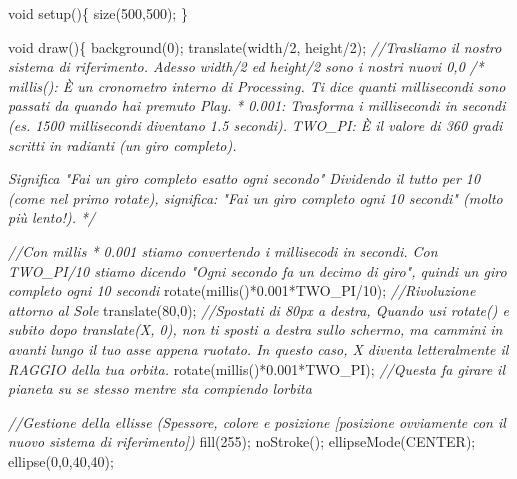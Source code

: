 \documentclass[
]{article}
\newenvironment{Shaded}{}{}
\newcommand{\CommentTok}[1]{\textcolor[rgb]{0.38,0.63,0.69}{\textit{#1}}}
\newcommand{\DataTypeTok}[1]{\textcolor[rgb]{0.56,0.13,0.00}{#1}}
\newcommand{\DecValTok}[1]{\textcolor[rgb]{0.25,0.63,0.44}{#1}}
\newcommand{\FloatTok}[1]{\textcolor[rgb]{0.25,0.63,0.44}{#1}}
\newcommand{\FunctionTok}[1]{\textcolor[rgb]{0.02,0.16,0.49}{#1}}
\newcommand{\NormalTok}[1]{#1}
\newcommand{\OperatorTok}[1]{\textcolor[rgb]{0.40,0.40,0.40}{#1}}
\begin{document}
\begin{Shaded}
\begin{Highlighting}[]
\DataTypeTok{void} \FunctionTok{setup}\OperatorTok{()\{}
    \FunctionTok{size}\OperatorTok{(}\DecValTok{500}\OperatorTok{,}\DecValTok{500}\OperatorTok{);}
\OperatorTok{\}}

\DataTypeTok{void} \FunctionTok{draw}\OperatorTok{()\{}
    \FunctionTok{background}\OperatorTok{(}\DecValTok{0}\OperatorTok{);}
    \FunctionTok{translate}\OperatorTok{(}\NormalTok{width}\OperatorTok{/}\DecValTok{2}\OperatorTok{,}\NormalTok{ height}\OperatorTok{/}\DecValTok{2}\OperatorTok{);} \CommentTok{//Trasliamo il nostro sistema di riferimento. Adesso width/2 ed height/2 sono i nostri nuovi 0,0}
    \CommentTok{/*}
\CommentTok{    millis(): È un cronometro interno di Processing. Ti dice quanti millisecondi sono passati da quando hai premuto Play.}
\CommentTok{    * 0.001: Trasforma i millisecondi in secondi (es. 1500 millisecondi diventano 1.5 secondi).}
\CommentTok{    TWO\_PI: È il valore di 360 gradi scritti in radianti (un giro completo).}

\CommentTok{    Significa "Fai un giro completo esatto ogni secondo"}
\CommentTok{    Dividendo il tutto per 10 (come nel primo rotate), significa: "Fai un giro completo ogni 10 secondi" (molto più lento!).}
\CommentTok{    */}
    
    \CommentTok{//Con millis * 0.001 stiamo convertendo i millisecodi in secondi. Con TWO\_PI/10 stiamo dicendo "Ogni secondo fa un decimo di giro", quindi un giro completo ogni 10 secondi}
    \FunctionTok{rotate}\OperatorTok{(}\FunctionTok{millis}\OperatorTok{()*}\FloatTok{0.001}\OperatorTok{*}\NormalTok{TWO\_PI}\OperatorTok{/}\DecValTok{10}\OperatorTok{);} \CommentTok{//Rivoluzione attorno al Sole}
    \FunctionTok{translate}\OperatorTok{(}\DecValTok{80}\OperatorTok{,}\DecValTok{0}\OperatorTok{);} \CommentTok{//Spostati di 80px a destra, Quando usi rotate() e subito dopo translate(X, 0), non ti sposti a destra sullo schermo, ma cammini in avanti lungo il tuo asse appena ruotato. In questo caso, X diventa letteralmente il RAGGIO della tua orbita.}
    \FunctionTok{rotate}\OperatorTok{(}\FunctionTok{millis}\OperatorTok{()*}\FloatTok{0.001}\OperatorTok{*}\NormalTok{TWO\_PI}\OperatorTok{);} \CommentTok{//Questa fa girare il pianeta su se stesso mentre sta compiendo l\textquotesingle{}orbita}

    \CommentTok{//Gestione della ellisse (Spessore, colore e posizione [posizione ovviamente con il nuovo sistema di riferimento])}
    \FunctionTok{fill}\OperatorTok{(}\DecValTok{255}\OperatorTok{);}
    \FunctionTok{noStroke}\OperatorTok{();}
    \FunctionTok{ellipseMode}\OperatorTok{(}\NormalTok{CENTER}\OperatorTok{);}
    \FunctionTok{ellipse}\OperatorTok{(}\DecValTok{0}\OperatorTok{,}\DecValTok{0}\OperatorTok{,}\DecValTok{40}\OperatorTok{,}\DecValTok{40}\OperatorTok{);}
    

\end{Highlighting}
\end{Shaded}
\end{document}
